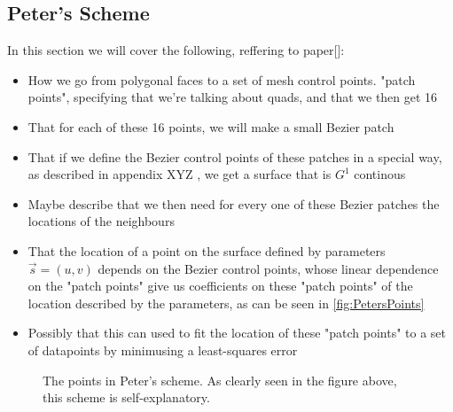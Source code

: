 \subsection{Peter's Scheme}
In this section we will cover the following, reffering to paper[]:
\begin{itemize}
\item How we go from polygonal faces to a set of mesh control points. "patch points", specifying that we're talking about quads, and that we then get 16
\item That for each of these 16 points, we will make a small Bezier patch
\item That if we define the Bezier control points of these patches in a special way, as described in appendix XYZ , we get a surface that is $G^1$ continous
\item Maybe describe that we then need for every one of these Bezier patches the locations of the neighbours
\item That the location of a point on the surface defined by parameters $\vec{s} = (u,v)$ depends on the Bezier control points, whose linear dependence on the "patch points" give us coefficients on these "patch points" of the location described by the parameters, as can be seen in \autoref{fig:PetersPoints}
\item Possibly that this can used to fit the location of these "patch points" to a set of datapoints by minimusing a least-squares error 
\end{itemize}
\begin{figure}

\label{fig:PetersPoints}
\caption{The points in Peter's scheme. As clearly seen in the figure above, this scheme is self-explanatory.}
\end{figure}